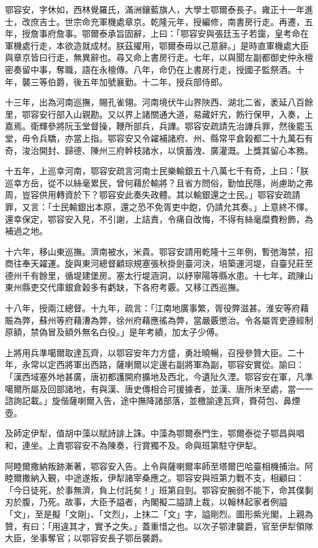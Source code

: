 \begin{pinyinscope}
鄂容安，字休如，西林覺羅氏，滿洲鑲藍旗人，大學士鄂爾泰長子。雍正十一年進士，改庶吉士。世宗命充軍機處章京。乾隆元年，授編修，南書房行走。再遷，五年，授詹事府詹事。鄂爾泰承旨固辭，上曰：「鄂容安與張廷玉子若靄，皇考命在軍機處行走，本欲造就成材。朕茲擢用，鄂爾泰毋以己意辭。」是時直軍機處大臣與章京皆曰行走，無異辭也。尋又命上書房行走。七年，以與聞左副都御史仲永檀密奏留中事，奪職，語在永檀傳。八年，命仍在上書房行走，授國子監祭酒。十年，襲三等伯爵，後五年加號襄勤。十二年，授兵部侍郎。

十三年，出為河南巡撫，賜孔雀翎。河南境伏牛山界陜西、湖北二省，袤延八百餘里，鄂容安行部入山親勘。又以界上諸關通大道，易藏奸宄，飭行保甲，入奏，上嘉焉。衛輝參將阮玉堂督操，鞭所部兵，兵譁。鄂容安疏請先治譁兵罪，然後罷玉堂，毋令兵驕，亦當上指。鄂容安又令糴補諸府、州、縣常平倉榖都二十九萬石有奇，浚治開封、歸德、陳州三府幹枝諸水，以慎蓄洩、廣灌溉。上獎其留心本務。

十五年，上巡幸河南，鄂容安疏言河南士民樂輸銀五十八萬七千有奇，上曰：「朕巡幸方岳，從不以絲毫累民，曾何藉於輸將？且省方問俗，勤恤民隱，尚慮助之弗周，豈容供用轉資於下？鄂容安此奏失政體。其以輸銀還之士民。」鄂容安疏請罪，又言：「士民輸銀出本原，還之恐不免胥吏中飽，仍請允其奏。」上意終不懌。還幸保定，鄂容安入見，不引謝，上詰責，令痛自改悔，不得有絲毫糜費粉飾，為補過之地。

十六年，移山東巡撫。濟南被水，米貴。鄂容安請用乾隆十三年例，暫弛海禁，招商往奉天糴運。旋與東河總督顧琮規塞張秋掛劍臺河決，培築運河堤，自臺兒莊至德州千有餘里，循堤建堡房。塞太行堤涵洞，以紓寧陽等縣水患。十七年，疏陳山東州縣吏交代庫銀倉榖多有虧缺，下各府考覈。又移江西巡撫。

十八年，授兩江總督。十九年，疏言：「江南地廣事繁，胥役弊滋甚。淮安等府藉賑為弊，蘇州等府藉漕為弊，徐州府藉應徭為弊，當嚴覈懲治。令各屬胥吏遵經制原額，禁偽冒及額外無名白役。」是年考績，加太子少傅。

上將用兵準噶爾取達瓦齊，以鄂容安年力方盛，勇壯曉暢，召授參贊大臣。二十年，永常以定西將軍出西路，薩喇爾以定邊右副將軍為副，鄂容安實從。諭曰：「漢西域塞外地甚廣，唐初都護開府擴地及西北，今遺阯久湮。鄂容安在軍，凡準噶爾所屬及回部諸地，有與漢、唐史傳相合可援據者，並漢、唐所未至處，當一一諮詢記載。」旋偕薩喇爾入告，途中撫降諸部落，並檄諭達瓦齊，賚荷包、鼻煙壺。

及師定伊犁，值胡中藻以賦詩誹上誅。中藻為鄂爾泰門生，鄂爾泰從子鄂昌與唱和，連坐。上責鄂容安不為陳奏，行賞獨不及。命與班第駐守伊犁。

阿睦爾撒納叛跡漸著，鄂容安入告。上令與薩喇爾率師至塔爾巴哈臺相機捕治。阿睦爾撒納入覲，中途遂叛，伊犁諸宰桑應之。鄂容安與班第力戰不支，相顧曰：「今日徒死，於事無濟，負上付託矣！」班第自剄。鄂容安腕弱不能下，命其僕剚刃於腹，乃死。故事，大臣予謚者，內閣擬二謚請上裁，以翰林起家者例謚「文」，至是擬「文剛」、「文烈」，上抹二「文」字，謚剛烈。圖形紫光閣，上親為贊，有曰：「用違其才，實予之失。」蓋重惜之也。以次子鄂津襲爵，官至伊犁領隊大臣，坐事奪官；以鄂容安長子鄂岳襲爵。


\end{pinyinscope}
